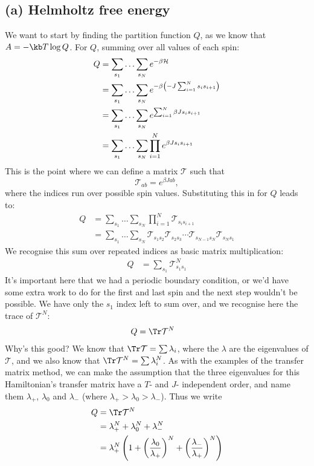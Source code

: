 \documentclass[../../PS3.tex]{subfiles}
\newcommand{\trm}{\mathcal{T}}
\begin{document}
\subsection*{(a) Helmholtz free energy}
We want to start by finding the partition function $Q$, as we know that $A = -\kb T \log{Q}$.
For $Q$, summing over all values of each spin:
\begin{align}
	Q &= \sum_{s_1} \dotso \sum_{s_N}  e^{-\beta \mathcal{H}} \\
	 &= \sum_{s_1} \dotso \sum_{s_N}  e^{-\beta \left(- J \sum_{i=1}^{N} s_i s_{i+1}\right)} \\
	 &= \sum_{s_1} \dotso \sum_{s_N}  e^{\sum_{i=1}^{N}  \beta J s_i s_{i+1}} \\
	 &= \sum_{s_1} \dotso \sum_{s_N} \prod_{i=1}^N  e^{\beta J s_i s_{i+1}}
\end{align}
This is the point where we can define a matrix $\trm$ such that 
\begin{equation} \label{eq:Prob6a:trmdef}
\trm_{ab} = e^{\beta J a b},
\end{equation} where the indices run over possible spin values. Substituting this in for $Q$ leads to:
\begin{align}
	Q &= \sum_{s_1} \dotso \sum_{s_N} \prod_{i=1}^N  \trm_{s_i s_{i+1}} \\
	&= \sum_{s_1} \dotso \sum_{s_N} \trm_{s_1 s_2} \trm_{s_2 s_3} \dotsm \trm_{s_{N-1} s_N}\trm_{s_N s_1}
\end{align}
We recognise this sum over repeated indices as basic matrix multiplication:
\begin{align}
	Q &= \sum_{s_1} \trm^N_{s_1 s_1} 
\end{align}
It's important here that we had a periodic boundary condition, or we'd have some extra work to do for the first and last spin and the next step wouldn't be possible. We have only the $s_1$ index left to sum over, and we recognise here the trace of $\trm^N$:
\begin{align}
	Q &= \Tr \trm^N
\end{align}
Why's this good? We know that $\Tr \trm = \sum \lambda_i$, where the $\lambda$ are the eigenvalues of $\trm$, and we also know that $\Tr \trm^N = \sum \lambda_i^N$. As with the examples of the transfer matrix method, we can make the assumption that the three eigenvalues for this Hamiltonian's transfer matrix have a $T$- and $J$- independent order, and name them $\lambda_+$, $\lambda_0$ and $\lambda_-$ (where $\lambda_+ > \lambda_0 > \lambda_-$). Thus we write
\begin{align}
	Q &= \Tr \trm^N \\
	&= \lambda_+^N + \lambda_0^N + \lambda_-^N \\
	&= \lambda_+^N \left(1 + \left(\frac{\lambda_0}{\lambda_+}\right)^N + \left(\frac{\lambda_-}{\lambda_+}\right)^N \right)
\end{align} 
\end{document}

